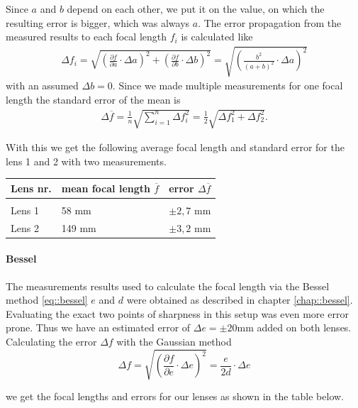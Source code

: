 Since $a$ and $b$ depend on each other, we put it on the value, on which the resulting error is bigger, which was always $a$.
The error propagation from the measured results to each focal length $f_i$ is calculated like
\begin{align}
  \displaystyle	\Delta f_i = \sqrt{\left(\frac{\partial f}{\partial a} \cdot \Delta a \right)^2 +\left(\frac{\partial f}{\partial b} \cdot \Delta b\right)^2 } = \sqrt{\left(\frac{b^2}{(a+b)^2}\cdot \Delta a\right)^2}
  \label{eq::gauss}
\end{align}
with an assumed $\Delta b = 0$. 
Since we made multiple measurements for one focal length the standard error of the mean is
\begin{align}
\displaystyle	\Delta \overline{f} =\frac{1}{n} \sqrt{\sum_{i=1}^{n}\Delta f_i^2} = \frac{1}{2}\sqrt{\Delta f_1^2 + \Delta f_2^2 }.
\label{eq::mean}
\end{align}

With this we get the following average focal length and standard error for the lens 1 and 2 with two measurements.

	\begin{tabularx}{\textwidth}{XM{5cm}M{5cm}}%
		\toprule 
		Lens nr.& mean focal length $\overline{f}$ & error $\Delta \overline{f}$\\
		\hline
		&&\\[-5pt]
		Lens 1	& 58 \si{\milli \m} & $\pm 2,7$ \si{\milli \m}	\\
		Lens 2	& 149 \si{\milli \m} & $\pm 3,2$ \si{\milli \m}	\\
		

		\bottomrule 
	\end{tabularx}

\paragraph{Bessel}
The measurements results used to calculate the focal length via the Bessel method \ref{eq::bessel} $e$ and $d$ were obtained as described in chapter \ref{chap::bessel}.
Evaluating the exact two points of sharpness in this setup was even more error prone.
Thus we have an estimated error of $\Delta e= \pm 20$\si{\milli\m} added on both lenses.
Calculating the error $\Delta f$ with the Gaussian method
\[
\displaystyle	\Delta f = \sqrt{\left(\frac{\partial f}{\partial e} \cdot \Delta e \right)^2 } = \frac{e}{2d}\cdot \Delta e
\]

we get the focal lengths and errors for our lenses as shown in the table below.

